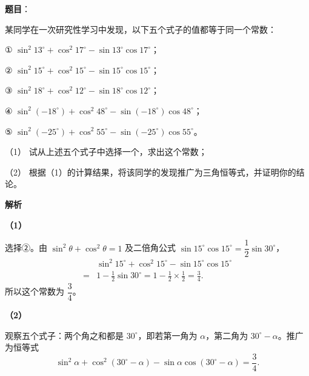 \begin{answer}


\end{answer}
\begin{answer}

\textbf{题目}：

某同学在一次研究性学习中发现，以下五个式子的值都等于同一个常数：

① $\sin^2 13^\circ+\cos^2 17^\circ-\sin 13^\circ\cos 17^\circ$；

② $\sin^2 15^\circ+\cos^2 15^\circ-\sin 15^\circ\cos 15^\circ$；

③ $\sin^2 18^\circ+\cos^2 12^\circ-\sin 18^\circ\cos 12^\circ$；

④ $\sin^2(-18^\circ)+\cos^2 48^\circ-\sin(-18^\circ)\cos 48^\circ$；

⑤ $\sin^2(-25^\circ)+\cos^2 55^\circ-\sin(-25^\circ)\cos 55^\circ$。

（1） 试从上述五个式子中选择一个，求出这个常数；

（2） 根据（1）的计算结果，将该同学的发现推广为三角恒等式，并证明你的结论。

\textbf{解析}

\textbf{（1）}

选择②。由 $\sin^2\theta+\cos^2\theta=1$ 及二倍角公式 $\sin15^\circ\cos15^\circ=\dfrac12\sin30^\circ$，
\nopagebreak[4]
\[\begin{aligned}
&\sin^2 15^\circ+\cos^2 15^\circ-\sin15^\circ\cos15^\circ\\
={}&1-\frac12\sin30^\circ
=1-\frac12\times\frac12
=\frac34.
\end{aligned}\]
所以这个常数为 $\dfrac34$。

\textbf{（2）}

观察五个式子：两个角之和都是 $30^\circ$，即若第一角为 $\alpha$，第二角为 $30^\circ-\alpha$。推广为恒等式
\nopagebreak[4]
\[\sin^2\alpha+\cos^2(30^\circ-\alpha)-\sin\alpha\cos(30^\circ-\alpha)=\frac34.\]


\end{answer}
